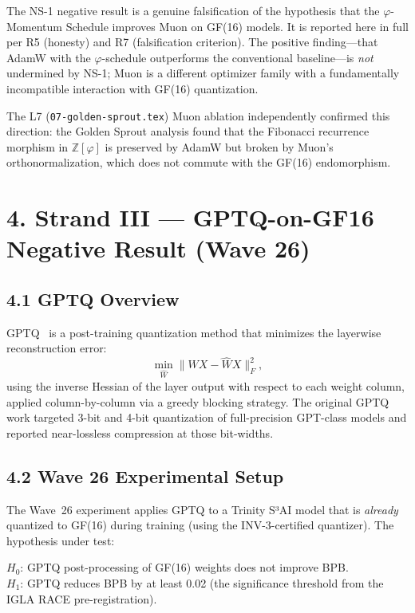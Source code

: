 The NS-1 negative result is a genuine falsification of the hypothesis
that the \(\varphi\)-Momentum Schedule improves Muon on GF(16) models.
It is reported here in full per R5 (honesty) and R7 (falsification
criterion).  The positive finding---that AdamW with the
\(\varphi\)-schedule outperforms the conventional baseline---is
\emph{not} undermined by NS-1; Muon is a different optimizer family
with a fundamentally incompatible interaction with GF(16) quantization.

The L7 (\texttt{07-golden-sprout.tex}) Muon ablation independently
confirmed this direction: the Golden Sprout analysis found that the
Fibonacci recurrence morphism in \(\mathbb{Z}[\varphi]\) is preserved
by AdamW but broken by Muon's orthonormalization, which does not
commute with the GF(16) endomorphism.

\section{4. Strand III --- GPTQ-on-GF16 Negative Result (Wave 26)}
\label{sec:28-strand-III}

\subsection{4.1 GPTQ Overview}

GPTQ~\cite{frantar_gptq_2023} is a post-training quantization method that
minimizes the layerwise reconstruction error:
\[
  \min_{\hat{W}} \|WX - \hat{W}X\|_F^2,
\]
using the inverse Hessian of the layer output with respect to each
weight column, applied column-by-column via a greedy blocking strategy.
The original GPTQ work targeted 3-bit and 4-bit quantization of
full-precision GPT-class models and reported near-lossless compression
at those bit-widths.

\subsection{4.2 Wave 26 Experimental Setup}

The Wave~26 experiment applies GPTQ to a Trinity S³AI model that
is \emph{already} quantized to GF(16) during training (using the
INV-3-certified quantizer).  The hypothesis under test:

\begin{center}
  \(H_0\): GPTQ post-processing of GF(16) weights does not improve BPB.\\
  \(H_1\): GPTQ reduces BPB by at least 0.02 (the significance threshold
  from the IGLA RACE pre-registration).
\end{center}

